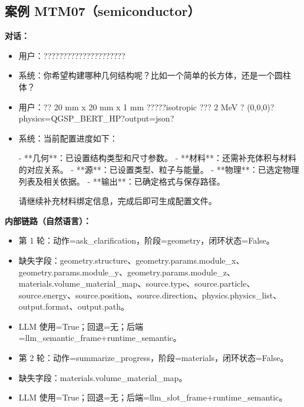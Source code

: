 \documentclass[11pt]{ctexart}
\begin{document}
\subsection{案例 MTM07（semiconductor）}
\textbf{对话：}
\begin{itemize}
\item 用户：?????????????????????
\item 系统：你希望构建哪种几何结构呢？比如一个简单的长方体，还是一个圆柱体？
\item 用户：?? 20 mm x 20 mm x 1 mm ?????isotropic ??? 2 MeV ? (0,0,0)?physics=QGSP\_BERT\_HP?output=json?
\item 系统：当前配置进度如下：

- **几何**：已设置结构类型和尺寸参数。
- **材料**：还需补充体积与材料的对应关系。
- **源**：已设置类型、粒子与能量。
- **物理**：已选定物理列表及相关依据。
- **输出**：已确定格式与保存路径。

请继续补充材料绑定信息，完成后即可生成配置文件。
\end{itemize}
\textbf{内部链路（自然语言）：}
\begin{itemize}
\item 第 1 轮：动作=ask\_clarification，阶段=geometry，闭环状态=False。
\item 缺失字段：geometry.structure、geometry.params.module\_x、geometry.params.module\_y、geometry.params.module\_z、materials.volume\_material\_map、source.type、source.particle、source.energy、source.position、source.direction、physics.physics\_list、output.format、output.path。
\item LLM 使用=True；回退=无；后端=llm\_semantic\_frame+runtime\_semantic。
\item 第 2 轮：动作=summarize\_progress，阶段=materials，闭环状态=False。
\item 缺失字段：materials.volume\_material\_map。
\item LLM 使用=True；回退=无；后端=llm\_slot\_frame+runtime\_semantic。
\end{itemize}
\end{document}
